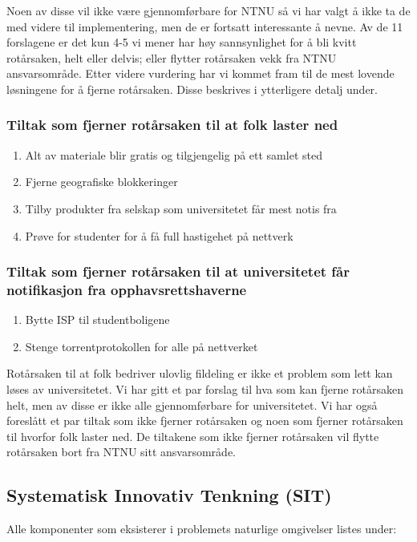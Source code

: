 Noen av disse vil ikke være gjennomførbare for NTNU så vi har valgt å ikke ta de med videre til implementering, men de er fortsatt interessante å nevne. Av de 11 forslagene er det kun 4-5 vi mener har høy sannsynlighet for å bli kvitt rotårsaken, helt eller delvis; eller flytter rotårsaken vekk fra NTNU ansvarsområde. Etter videre vurdering har vi kommet fram til de mest lovende løsningene for å fjerne rotårsaken. Disse beskrives i ytterligere detalj under.

\subsubsection{Tiltak som fjerner rotårsaken til at folk laster ned}

\begin{enumerate}
    \item Alt av materiale blir gratis og tilgjengelig på ett samlet sted
    \item Fjerne geografiske blokkeringer
    \item Tilby produkter fra selskap som universitetet får mest notis fra
    \item Prøve for studenter for å få full hastigehet på nettverk
\end{enumerate}

\subsubsection{Tiltak som fjerner rotårsaken til at universitetet får notifikasjon fra opphavsrettshaverne}

\begin{enumerate}
    \item Bytte ISP til studentboligene
    \item Stenge torrentprotokollen for alle på nettverket
\end{enumerate}

Rotårsaken til at folk bedriver ulovlig fildeling er ikke et problem som lett kan løses av universitetet. Vi har gitt et par forslag til hva som kan fjerne rotårsaken helt, men av disse er ikke alle gjennomførbare for universitetet. Vi har også foreslått et par tiltak som ikke fjerner rotårsaken og noen som fjerner rotårsaken til hvorfor folk laster ned. De tiltakene som ikke fjerner rotårsaken vil flytte rotårsaken bort fra NTNU sitt ansvarsområde.

\subsection{Systematisk Innovativ Tenkning (SIT)}
Alle komponenter som eksisterer i problemets naturlige omgivelser listes under:

